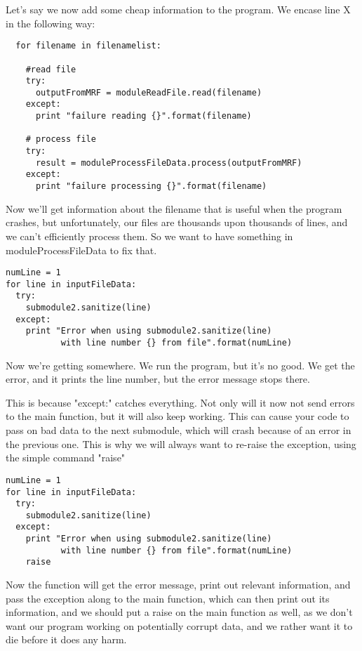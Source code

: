 \documentclass[10pt,a4paper]{article}
\begin{document}
Let's say we now add some cheap information to the program. We encase line X in the following way:

\begin{lstlisting}
  for filename in filenamelist:

    #read file
    try:
      outputFromMRF = moduleReadFile.read(filename)
    except:
      print "failure reading {}".format(filename)
      
    # process file
    try: 
      result = moduleProcessFileData.process(outputFromMRF)
    except: 
      print "failure processing {}".format(filename)
\end{lstlisting}

Now we'll get information about the filename that is useful when the program crashes, but unfortunately, our files are thousands upon thousands of lines, and we can't efficiently process them. So we want to have something in moduleProcessFileData to fix that.

\begin{lstlisting}
numLine = 1
for line in inputFileData:
  try: 
    submodule2.sanitize(line)
  except:
    print "Error when using submodule2.sanitize(line) 
           with line number {} from file".format(numLine)

\end{lstlisting}

Now we're getting somewhere. We run the program, but it's no good. We get the error, and it prints the line number, but the error message stops there.

This is because "except:" catches everything. Not only will it now not send errors to the main function, but it will also keep working. This can cause your code to pass on bad data to the next submodule, which will crash because of an error in the previous one. This is why we will always want to re-raise the exception, using the simple command "raise"


\begin{lstlisting}
numLine = 1
for line in inputFileData:
  try: 
    submodule2.sanitize(line)
  except:
    print "Error when using submodule2.sanitize(line) 
           with line number {} from file".format(numLine)
    raise

\end{lstlisting}

Now the function will get the error message, print out relevant information, and pass the exception along to the main function, which can then print out its information, and we should put a raise on the main function as well, as we don't want our program working on potentially corrupt data, and we rather want it to die before it does any harm. 
\end{document}
